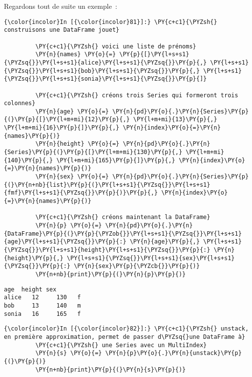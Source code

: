 Regardons tout de suite un exemple~:

    \begin{Verbatim}[commandchars=\\\{\}]
{\color{incolor}In [{\color{incolor}81}]:} \PY{c+c1}{\PYZsh{} construisons une DataFrame jouet}
         
         \PY{c+c1}{\PYZsh{} voici une liste de prénoms}
         \PY{n}{names} \PY{o}{=} \PY{p}{[}\PY{l+s+s1}{\PYZsq{}}\PY{l+s+s1}{alice}\PY{l+s+s1}{\PYZsq{}}\PY{p}{,} \PY{l+s+s1}{\PYZsq{}}\PY{l+s+s1}{bob}\PY{l+s+s1}{\PYZsq{}}\PY{p}{,} \PY{l+s+s1}{\PYZsq{}}\PY{l+s+s1}{sonia}\PY{l+s+s1}{\PYZsq{}}\PY{p}{]}
         
         \PY{c+c1}{\PYZsh{} créons trois Series qui formeront trois colonnes}
         \PY{n}{age} \PY{o}{=} \PY{n}{pd}\PY{o}{.}\PY{n}{Series}\PY{p}{(}\PY{p}{[}\PY{l+m+mi}{12}\PY{p}{,} \PY{l+m+mi}{13}\PY{p}{,} \PY{l+m+mi}{16}\PY{p}{]}\PY{p}{,} \PY{n}{index}\PY{o}{=}\PY{n}{names}\PY{p}{)}
         \PY{n}{height} \PY{o}{=} \PY{n}{pd}\PY{o}{.}\PY{n}{Series}\PY{p}{(}\PY{p}{[}\PY{l+m+mi}{130}\PY{p}{,} \PY{l+m+mi}{140}\PY{p}{,} \PY{l+m+mi}{165}\PY{p}{]}\PY{p}{,} \PY{n}{index}\PY{o}{=}\PY{n}{names}\PY{p}{)}
         \PY{n}{sex} \PY{o}{=} \PY{n}{pd}\PY{o}{.}\PY{n}{Series}\PY{p}{(}\PY{n+nb}{list}\PY{p}{(}\PY{l+s+s1}{\PYZsq{}}\PY{l+s+s1}{fmf}\PY{l+s+s1}{\PYZsq{}}\PY{p}{)}\PY{p}{,} \PY{n}{index}\PY{o}{=}\PY{n}{names}\PY{p}{)}
         
         \PY{c+c1}{\PYZsh{} créons maintenant la DataFrame}
         \PY{n}{p} \PY{o}{=} \PY{n}{pd}\PY{o}{.}\PY{n}{DataFrame}\PY{p}{(}\PY{p}{\PYZob{}}\PY{l+s+s1}{\PYZsq{}}\PY{l+s+s1}{age}\PY{l+s+s1}{\PYZsq{}}\PY{p}{:} \PY{n}{age}\PY{p}{,} \PY{l+s+s1}{\PYZsq{}}\PY{l+s+s1}{height}\PY{l+s+s1}{\PYZsq{}}\PY{p}{:} \PY{n}{height}\PY{p}{,} \PY{l+s+s1}{\PYZsq{}}\PY{l+s+s1}{sex}\PY{l+s+s1}{\PYZsq{}}\PY{p}{:} \PY{n}{sex}\PY{p}{\PYZcb{}}\PY{p}{)}
         \PY{n+nb}{print}\PY{p}{(}\PY{n}{p}\PY{p}{)}
\end{Verbatim}


    \begin{Verbatim}[commandchars=\\\{\}]
       age  height sex
alice   12     130   f
bob     13     140   m
sonia   16     165   f

    \end{Verbatim}

    \begin{Verbatim}[commandchars=\\\{\}]
{\color{incolor}In [{\color{incolor}82}]:} \PY{c+c1}{\PYZsh{} unstack, en première approximation, permet de passer d\PYZsq{}une DataFrame à}
         \PY{c+c1}{\PYZsh{} une Series avec un MultiIndex}
         \PY{n}{s} \PY{o}{=} \PY{n}{p}\PY{o}{.}\PY{n}{unstack}\PY{p}{(}\PY{p}{)}
         \PY{n+nb}{print}\PY{p}{(}\PY{n}{s}\PY{p}{)}
\end{Verbatim}


